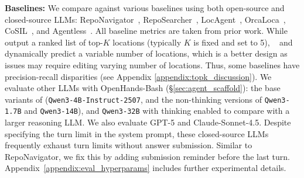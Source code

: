 \textbf{Baselines:} We compare \methodname against various baselines using both open-source and closed-source LLMs: RepoNavigator~\citep{zhang2025one}, RepoSearcher~\citep{ma2025toolintegratedreinforcementlearningrepo}, LocAgent~\citep{chen-etal-2025-locagent}, OrcaLoca~\citep{yu2025orcalocallmagentframework}, CoSIL~\citep{jiang2025issuelocalizationllmdriveniterative}, and Agentless~\citep{xia2024agentless}. All baseline metrics are taken from prior work. While ~\citet{ma2025toolintegratedreinforcementlearningrepo,jiang2025issuelocalizationllmdriveniterative,chen-etal-2025-locagent,xia2024agentless} output a ranked list of top-$K$ locations (typically $K$ is fixed and set to 5), ~\citet{zhang2025one, yu2025orcalocallmagentframework} and \methodname dynamically predict a variable number of locations, which is a better design as issues may require editing varying number of locations. Thus, some baselines have  precision-recall disparities (see Appendix \ref{appendix:topk_discussion}). We evaluate other LLMs with OpenHands-Bash (\S\ref{sec:agent_scaffold}): the base variants of \methodname (\texttt{Qwen3-4B-Instruct-2507}, and the non-thinking versions of \texttt{Qwen3-1.7B} and \texttt{Qwen3-14B}), and \texttt{Qwen3-32B} with thinking enabled to compare with a larger reasoning LLM. We also evaluate GPT-5 and Claude-Sonnet-4.5. Despite specifying the turn limit in the system prompt, these closed-source LLMs frequently exhaust turn limits without answer submission. Similar to RepoNavigator, we fix this by adding submission reminder before the last turn. Appendix~\ref{appendix:eval_hyperparams} includes further experimental details.